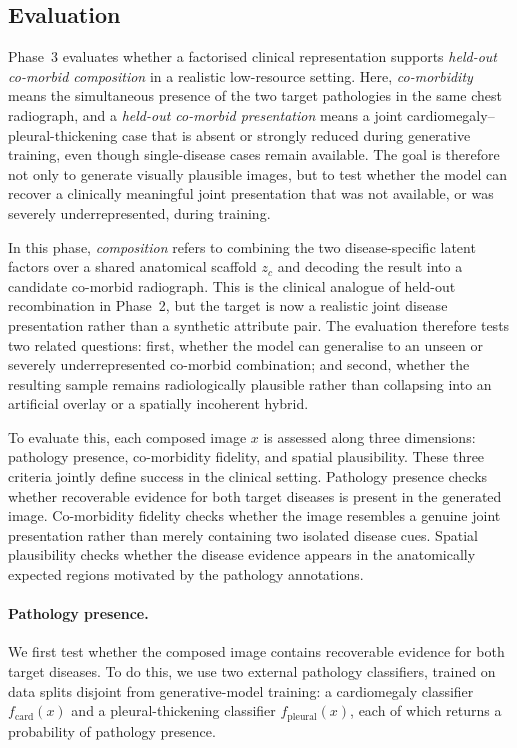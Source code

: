 \subsection{Evaluation}
\label{subsec:p3_eval}

Phase~3 evaluates whether a factorised clinical representation supports \emph{held-out co-morbid composition} in a realistic low-resource setting. Here, \emph{co-morbidity} means the simultaneous presence of the two target pathologies in the same chest radiograph, and a \emph{held-out co-morbid presentation} means a joint cardiomegaly--pleural-thickening case that is absent or strongly reduced during generative training, even though single-disease cases remain available. The goal is therefore not only to generate visually plausible images, but to test whether the model can recover a clinically meaningful joint presentation that was not available, or was severely underrepresented, during training.

In this phase, \emph{composition} refers to combining the two disease-specific latent factors over a shared anatomical scaffold \(z_c\) and decoding the result into a candidate co-morbid radiograph. This is the clinical analogue of held-out recombination in Phase~2, but the target is now a realistic joint disease presentation rather than a synthetic attribute pair. The evaluation therefore tests two related questions: first, whether the model can generalise to an unseen or severely underrepresented co-morbid combination; and second, whether the resulting sample remains radiologically plausible rather than collapsing into an artificial overlay or a spatially incoherent hybrid.

To evaluate this, each composed image \(x\) is assessed along three dimensions: pathology presence, co-morbidity fidelity, and spatial plausibility. These three criteria jointly define success in the clinical setting. Pathology presence checks whether recoverable evidence for both target diseases is present in the generated image. Co-morbidity fidelity checks whether the image resembles a genuine joint presentation rather than merely containing two isolated disease cues. Spatial plausibility checks whether the disease evidence appears in the anatomically expected regions motivated by the pathology annotations.

\paragraph{Pathology presence.}
We first test whether the composed image contains recoverable evidence for both target diseases. To do this, we use two external pathology classifiers, trained on data splits disjoint from generative-model training: a cardiomegaly classifier \(f_{\mathrm{card}}(x)\) and a pleural-thickening classifier \(f_{\mathrm{pleural}}(x)\), each of which returns a probability of pathology presence.

